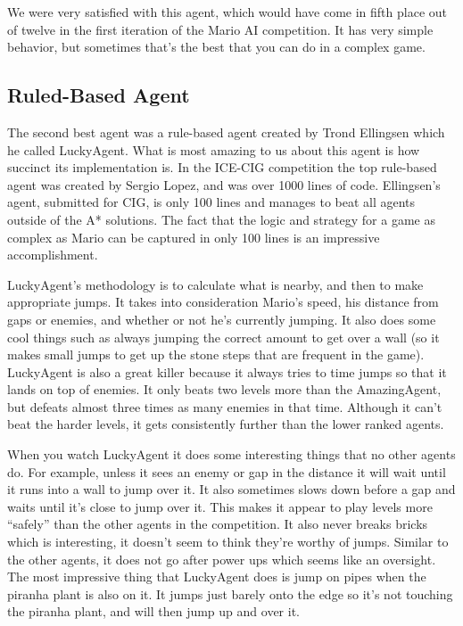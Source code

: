 \documentclass[12pt]{article}
\begin{document}
\begin{multicols*}{2}
We were very satisfied with this agent, which would have come in fifth place out of twelve in the 
first iteration of the Mario AI competition.  It has very simple behavior, but sometimes that's the best 
that you can do in a complex game.

\subsection*{Ruled-Based Agent}
The second best agent was a rule-based agent created by Trond Ellingsen which he called 
LuckyAgent.  What is most amazing to us about this agent is how succinct its implementation is.  
In the ICE-CIG competition the top rule-based agent was created by Sergio Lopez, and was over 
1000 lines of code.  Ellingsen's agent, submitted for CIG, is only 100 lines 
and manages to beat all agents outside of the 
A* solutions.  The fact that the logic and strategy for a game as complex as Mario can be captured 
in only 100 lines is an impressive accomplishment.

LuckyAgent's methodology is to calculate what is nearby, and then to make appropriate jumps.  It takes 
into consideration Mario's speed, his distance from gaps or enemies, and whether or not he's 
currently jumping.  It also does some cool things such as always jumping the correct amount to 
get over a wall (so it makes small jumps to get up the stone steps that are frequent in the game).  
LuckyAgent is also a great killer because it always tries to time jumps so that it lands 
on top of enemies.  It only beats two levels more than the AmazingAgent, but defeats almost three 
times as many enemies in that time.  Although it can't beat the harder levels, it gets consistently further 
than the lower ranked agents.

When you watch LuckyAgent it does some interesting things that no other agents do.  For example, 
unless it sees an enemy or gap in the distance it will wait until it runs into a wall to jump over it.  
It also sometimes slows down before a gap and waits until it's close to jump over it.  This makes it 
appear to play levels more ``safely'' than the other agents in the competition.  It also never breaks 
bricks which is interesting, it doesn't seem to think they're worthy of jumps.  Similar to the other agents, 
it does not go after power ups which seems like an oversight.  The most impressive thing that 
LuckyAgent does is jump on pipes when the piranha plant is also on it.  It jumps just barely onto the 
edge so it's not touching the piranha plant, and will then jump up and over it.


\end{multicols*}
\end{document}
